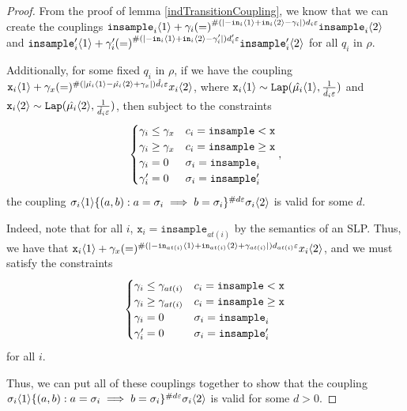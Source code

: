 \begin{proof}
    From the proof of lemma \ref{indTransitionCoupling}, we know that we can create the couplings $\texttt{insample}_i\brangle{1} +\gamma_i{(=)}^{\#(|-\texttt{in}_i\brangle{1}+\texttt{in}_i\brangle{2}-\gamma_i|)d_i\varepsilon}\texttt{insample}_i\brangle{2}$ and $\texttt{insample}_i'\brangle{1} +\gamma_i'{(=)}^{\#(|-\texttt{in}_i\brangle{1}+\texttt{in}_i\brangle{2}-\gamma_i'|)d_i'\varepsilon}\texttt{insample}_i'\brangle{2}$ for all $q_i$ in $\rho$. 

    Additionally, for some fixed $q_i$ in $\rho$, if we have the coupling $\texttt{x}_i\brangle{1}+\gamma_x (=)^{\#(|\hat{\mu_i}\brangle{1}-\hat{\mu_i}\brangle{2}+\gamma_x|)\hat{d_i}\varepsilon}x_i\brangle{2}$, where $\texttt{x}_i\brangle{1}\sim \Lap(\hat{\mu_i}\brangle{1}, \frac{1}{\hat{d_i}\varepsilon})$ and $\texttt{x}_i\brangle{2}\sim \Lap(\hat{\mu_i}\brangle{2}, \frac{1}{\hat{d_i}\varepsilon})$, then subject to the constraints \[
        \begin{cases}
          \gamma_i\leq\gamma_x & c_i = \lguard[\texttt{x}]\\
          \gamma_i\geq\gamma_x & c_i = \gguard[\texttt{x}]\\
          \gamma_i=0 & \sigma_i = \texttt{insample}_i\\
          \gamma_i'=0 & \sigma_i = \texttt{insample}_i'
        \end{cases},
      \]
    the coupling $\sigma_i\brangle{1}\{(a, b): a=\sigma_i\implies b=\sigma_i\}^{\#d\varepsilon}\sigma_i\brangle{2}$ is valid for some $d$. 

    Indeed, note that for all $i$, $\texttt{x}_i = \texttt{insample}_{at(i)}$ by the semantics of an SLP. Thus, we have that $\texttt{x}_i\brangle{1}+\gamma_x (=)^{\#(|-\texttt{in}_{at(i)}\brangle{1}+\texttt{in}_{at(i)}\brangle{2}+\gamma_{at(i)}|)d_{at(i)}\varepsilon}x_i\brangle{2}$, and we must satisfy the constraints \[
        \begin{cases}
          \gamma_i\leq\gamma_{at(i)} & c_i = \lguard[\texttt{x}]\\
          \gamma_i\geq\gamma_{at(i)} & c_i = \gguard[\texttt{x}]\\
          \gamma_i=0 & \sigma_i = \texttt{insample}_i\\
          \gamma_i'=0 & \sigma_i = \texttt{insample}_i'
        \end{cases}
      \]
      for all $i$.

    Thus, we can put all of these couplings together to show that the coupling $\sigma_i\brangle{1}\{(a, b): a=\sigma_i\implies b=\sigma_i\}^{\#d\varepsilon}\sigma_i\brangle{2}$ is valid for some $d>0$.


\end{proof}
